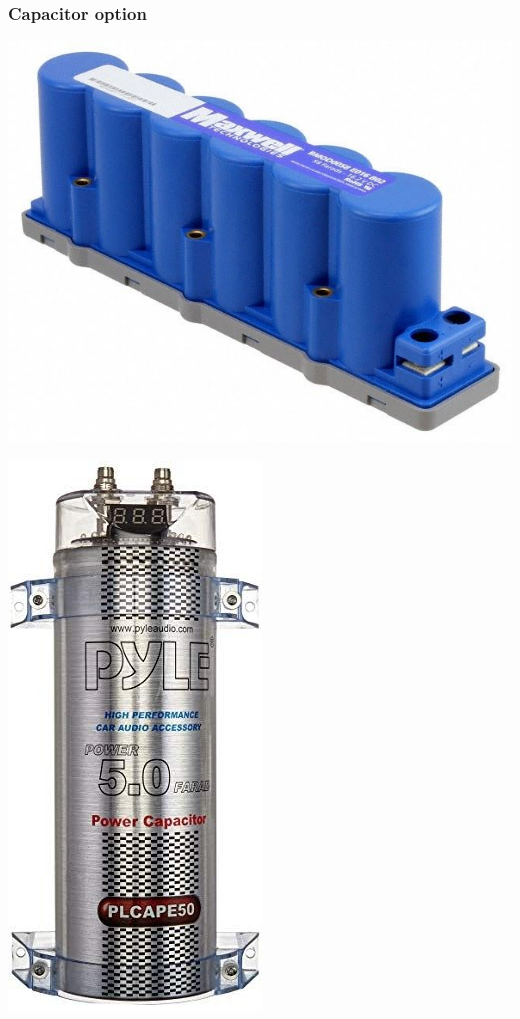 \documentclass{article}
\theoremstyle{definition}
\theoremstyle{definition}
\theoremstyle{remark}
\begin{document}

    \subsubsection{Capacitor option} %
    \label{ssub:capacitor_option}

      \begin{center}
        \includegraphics[width=0.15\paperwidth]{../Images/image_3_3_(capacitor_1).png}
      \end{center}

      \begin{center}
        \includegraphics[width=0.10\paperwidth]{../Images/image_3_4_(capacitor_2).png}
      \end{center}
\end{document}

